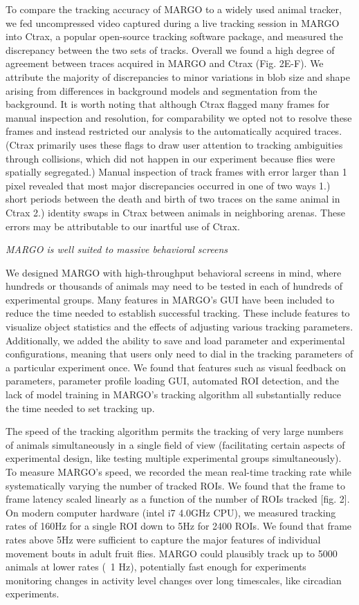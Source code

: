\documentclass[10pt]{article}
\begin{document}
\begin{multicols}{2}
To compare the tracking accuracy of MARGO to a widely used animal tracker, we fed uncompressed video captured during a live tracking session in MARGO into Ctrax\cite{Branson_High_2009}, a popular open-source tracking software package, and measured the discrepancy between the two sets of tracks. Overall we found a high degree of agreement between traces acquired in MARGO and Ctrax (Fig. 2E-F). We attribute the majority of discrepancies to minor variations in blob size and shape arising from differences in background models and segmentation from the background. It is worth noting that although Ctrax flagged many frames for manual inspection and resolution, for comparability we opted not to resolve these frames and instead restricted our analysis to the automatically acquired traces. (Ctrax primarily uses these flags to draw user attention to tracking ambiguities through collisions, which did not happen in our experiment because flies were spatially segregated.) Manual inspection of track frames with error larger than 1 pixel revealed that most major discrepancies occurred in one of two ways 1.) short periods between the death and birth of two traces on the same animal in Ctrax 2.) identity swaps in Ctrax between animals in neighboring arenas. These errors may be attributable to our inartful use of Ctrax.

\textit{MARGO is well suited to massive behavioral screens}

We designed MARGO with high-throughput behavioral screens in mind, where hundreds or thousands of animals may need to be tested in each of hundreds of experimental groups. Many features in MARGO's GUI have been included to reduce the time needed to establish successful tracking. These include features to visualize object statistics and the effects of adjusting various tracking parameters. Additionally, we added the ability to save and load parameter and experimental configurations, meaning that users only need to dial in the tracking parameters of a particular experiment once. We found that features such as visual feedback on parameters, parameter profile loading GUI, automated ROI detection, and the lack of model training in MARGO's tracking algorithm all substantially reduce the time needed to set tracking up. 

The speed of the tracking algorithm permits the tracking of very large numbers of animals simultaneously in a single field of view (facilitating certain aspects of experimental design, like testing multiple experimental groups simultaneously). To measure MARGO's speed, we recorded the mean real-time tracking rate while systematically varying the number of tracked ROIs. We found that the frame to frame latency scaled linearly as a function of the number of ROIs tracked [fig. 2]. On modern computer hardware (intel i7 4.0GHz CPU), we measured tracking rates of 160Hz for a single ROI down to 5Hz for 2400 ROIs. We found that frame rates above 5Hz were sufficient to capture the major features of individual movement bouts in adult fruit flies. MARGO could plausibly track up to 5000 animals at lower rates (~1 Hz), potentially fast enough for experiments monitoring changes in activity level changes over long timescales, like circadian experiments. 


\end{multicols}
\end{document}
